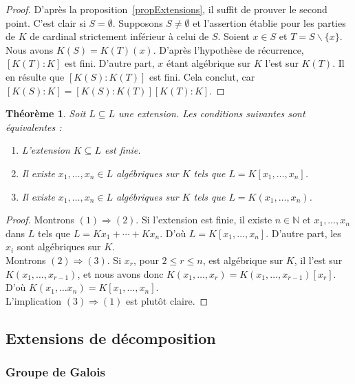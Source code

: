 \documentclass[a4paper, titlepage]{article}
\newtheorem{theo}{Théorème}[section]
\theoremstyle{definition}
\theoremstyle{remark}
\def\N{\mathbb N}
\begin{document}
\begin{proof}
D'après la proposition~\ref{propExtensions}, il suffit de prouver le second point. C'est clair si $S = \emptyset$. Supposons $S \neq \emptyset$ et l'assertion établie pour les parties de $K$ de cardinal strictement inférieur à celui de $S$. Soient $x \in S$ et $T = S\backslash \{x\}$. Nous avons $K(S) = K(T)(x)$. D'après l'hypothèse de récurrence, $[K(T) : K]$ est fini. D'autre part, $x$ étant algébrique sur $K$ l'est sur $K(T)$. Il en résulte que $[K(S):K(T)]$ est fini. Cela conclut, car $[K(S):K] = [K(S):K(T)][K(T):K]$.
\end{proof}

\begin{theo}
Soit $L \subseteq L$ une extension. Les conditions suivantes sont équivalentes : \begin{enumerate}
\item L'extension $K \subseteq L$ est finie.
\item Il existe $x_1, \dots, x_n \in L$ algébriques sur $K$ tels que $L = K[x_1, \dots, x_n]$.
\item Il existe $x_1, \dots, x_n \in L$ algébriques sur $K$ tels que $L = K(x_1, \dots, x_n)$.
\end{enumerate}
\end{theo}

\begin{proof}
Montrons $(1) \Rightarrow (2)$. Si l'extension est finie, il existe $n\in\N$ et $x_1, \dots, x_n$ dans $L$ tels que $L = Kx_1 + \cdots + Kx_n$. D'où $L = K[x_1, \dots, x_n]$. D'autre part, les $x_i$ sont algébriques sur $K$.\\
Montrons $(2) \Rightarrow (3)$. Si $x_r$, pour $2 \leqslant r \leqslant n$, est algébrique sur $K$, il l'est sur $K(x_1, \dots, x_{r-1})$, et nous avons donc $K(x_1, \dots, x_r) = K(x_1, \dots, x_{r-1})[x_r]$. D'où $K(x_1, \dots x_n) = K[x_1, \dots, x_n]$.\\
L'implication $(3) \Rightarrow (1)$ est plutôt claire.
\end{proof}

\subsection{Extensions de décomposition}

\subsubsection*{Groupe de Galois}
\end{document}
